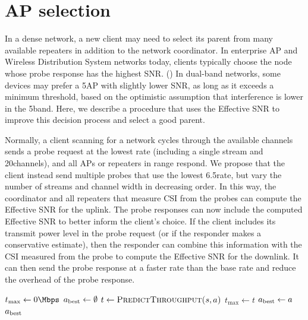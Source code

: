 \section{AP selection}\label{sec:esnr_apsel}
In a dense network, a new client may need to select its parent from many available repeaters in addition to the network coordinator. In enterprise AP and Wireless Distribution System networks today, clients typically choose the node whose probe response has the highest SNR\@. () In dual-band networks, some devices may prefer a 5\GHz AP with slightly lower SNR, as long as it exceeds a minimum threshold, based on the optimistic assumption that interference is lower in the 5\GHz band. Here, we describe a procedure that uses the Effective SNR to improve this decision process and select a good parent.

Normally, a client scanning for a network cycles through the available channels sends a probe request at the lowest rate (including a single stream and 20\MHz channels), and all APs or repeaters in range respond. We propose that the client instead send multiple probes that use the lowest 6.5\Mbps rate, but vary the number of streams and channel width in decreasing order. In this way, the coordinator and all repeaters that measure CSI from the probes can compute the Effective SNR for the uplink. The probe responses can now include the computed Effective SNR to better inform the client's choice. If the client includes its transmit power level in the probe request (or if the responder makes a conservative estimate), then the responder can combine this information with the CSI measured from the probe to compute the Effective SNR for the downlink. It can then send the probe response at a faster rate than the base rate and reduce the overhead of the probe response.

\begin{algorithm}[htp]
\caption{\label{alg:ap_sel_basic}}
\begin{algorithmic}
\STATE $t_{\max}\gets 0\Mbps$
\STATE $a_{\mathrm{best}} \gets \emptyset$
\STATE $t \gets \textsc{PredictThroughput($s, a$)}$
	\STATE $t_{\max} \gets t$
	\STATE $a_{\mathrm{best}} \gets a$
\ENDIF
\RETURN $a_{\mathrm{best}}$
\ENDFOR
\end{algorithmic}
\end{algorithm}



